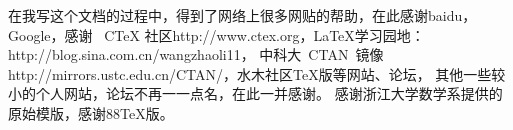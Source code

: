 \begin{thanks}
在我写这个文档的过程中，得到了网络上很多网贴的帮助，在此感谢baidu，Google，感谢
~CTeX 社区http://www.ctex.org，\LaTeX{}学习园地：http://blog.sina.com.cn/wangzhaoli11，
中科大~CTAN~镜像http://mirrors.ustc.edu.cn/CTAN/，水木社区\TeX{}版等网站、论坛，
其他一些较小的个人网站，论坛不再一一点名，在此一并感谢。
感谢浙江大学数学系提供的原始模版，感谢88\TeX{}版。
\end{thanks}
